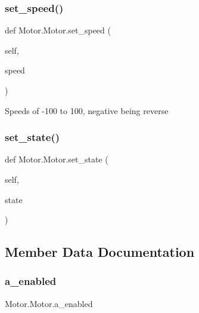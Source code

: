 \mbox{\label{class_motor_1_1_motor_a77fe4c03a7048d04172fcfca50c42e1d}} 
\subsubsection{\texorpdfstring{set\+\_\+speed()}{set\_speed()}}
{\footnotesize\ttfamily def Motor.\+Motor.\+set\+\_\+speed (\begin{DoxyParamCaption}\item[{}]{self,  }\item[{}]{speed }\end{DoxyParamCaption})}

\begin{DoxyVerb}Speeds of -100 to 100, negative being reverse
\end{DoxyVerb}
 \mbox{\label{class_motor_1_1_motor_a43d6487962d166187b7c877d8dd87a40}} 
\subsubsection{\texorpdfstring{set\+\_\+state()}{set\_state()}}
{\footnotesize\ttfamily def Motor.\+Motor.\+set\+\_\+state (\begin{DoxyParamCaption}\item[{}]{self,  }\item[{}]{state }\end{DoxyParamCaption})}



\subsection{Member Data Documentation}
\mbox{\label{class_motor_1_1_motor_a38cf3355fa1ced6aea642b65d8f1bd5c}} 
\subsubsection{\texorpdfstring{a\+\_\+enabled}{a\_enabled}}
{\footnotesize\ttfamily Motor.\+Motor.\+a\+\_\+enabled}

